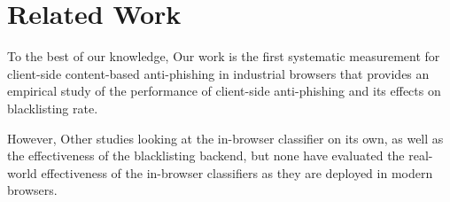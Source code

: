 
\section{Related Work}
\label{s:related}












To the best of our knowledge, Our work is the first systematic measurement for client-side content-based anti-phishing in industrial browsers that provides an empirical study of the performance of client-side anti-phishing and its effects on blacklisting rate. 

However, Other studies looking at the in-browser classifier on its own, as well as the effectiveness of the blacklisting backend, but none have evaluated the real-world effectiveness of the in-browser classifiers as they are deployed in modern browsers.

